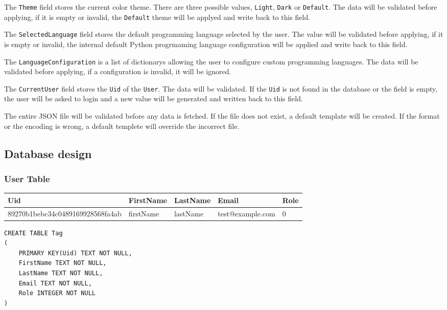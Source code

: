 \documentclass[a4paper]{report}
\begin{document}
The \texttt{Theme} field stores the current color theme. There are three possible values, \texttt{Light}, \texttt{Dark} or \texttt{Default}. The data will be validated before applying, if it is empty or invalid, the \texttt{Default} theme will be applyed and write back to this field.

The \texttt{SelectedLanguage} field stores the default programming language selected by the user. The value will be validated before applying, if it is empty or invalid, the internal default Python progrmaming language configuration will be applied and write back to this field.

The \texttt{LanguageConfiguration} is a list of dictionarys allowing the user to configure custom programming languages. The data will be validated before applying, if a configuration is invalid, it will be ignored.

The \texttt{CurrentUser} field stores the \texttt{Uid} of the \texttt{User}. The data will be validated. If the \texttt{Uid} is not found in the database or the field is empty, the user will be asked to login and a new value will be generated and written back to this field.

The entire JSON file will be validated before any data is fetched. If the file does not exist, a default template will be created. If the format or the encoding is wrong, a default templete will override the incorrect file.

\subsection{Database design}

\subsubsection{User Table}

\begin{tabulary}{\textwidth}{|L|L|L|L|L|}
    \hline
    Uid & FirstName & LastName & Email & Role \\
    \hline
    89270b1bebc34c0489169928568fa4ab & firstName & lastName & test@example.com & 0 \\
    \hline
\end{tabulary}

\begin{verbatim}
CREATE TABLE Tag
(
    PRIMARY KEY(Uid) TEXT NOT NULL,
    FirstName TEXT NOT NULL,
    LastName TEXT NOT NULL,
    Email TEXT NOT NULL,
    Role INTEGER NOT NULL
)
\end{verbatim}
\end{document}
